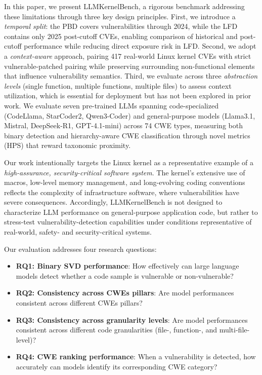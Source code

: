 \documentclass[lettersize,journal]{IEEEtran}
\begin{document}
In this paper, we present LLMKernelBench, a rigorous benchmark addressing these limitations through three key design principles. First, we introduce a \emph{temporal split}: the \gls{PBD} covers vulnerabilities through 2024, while the \gls{LFD} contains only 2025 post-cutoff CVEs, enabling comparison of historical and post-cutoff performance while reducing direct exposure risk in LFD. Second, we adopt a \emph{context-aware} approach, pairing 417 real-world Linux kernel CVEs with strict vulnerable-patched pairing while preserving surrounding non-functional elements that influence vulnerability semantics. Third, we evaluate across three \emph{abstraction levels} (single function, multiple functions, multiple files) to assess context utilization, which is essential for deployment but has not been explored in prior work. We evaluate seven pre-trained \glspl{LLM} spanning code-specialized (CodeLlama, StarCoder2, Qwen3-Coder) and general-purpose models (Llama3.1, Mistral, DeepSeek-R1, GPT-4.1-mini) across 74 \gls{CWE} types, measuring both binary detection and hierarchy-aware CWE classification through novel metrics (\gls{HPS}) that reward taxonomic proximity.

Our work intentionally targets the Linux kernel as a representative example of a \emph{high-assurance, security-critical software system}. The kernel’s extensive use of macros, low-level memory management, and long-evolving coding conventions reflects the complexity of infrastructure software, where vulnerabilities have severe consequences. Accordingly, LLMKernelBench is not designed to characterize LLM performance on general-purpose application code, but rather to stress-test vulnerability-detection capabilities under conditions representative of real-world, safety- and security-critical systems.

Our evaluation addresses four research questions: 



\begin{itemize}

\item \textbf{RQ1: Binary \gls{SVD} performance}: How effectively can large language models detect whether a code sample is vulnerable or non-vulnerable?

\item \textbf{RQ2: Consistency across \glspl{CWE} pillars}: Are model performances consistent across different \glspl{CWE} pillars?

\item \textbf{RQ3: Consistency across granularity levels}: Are model performances consistent across different code granularities (file-, function-, and multi-file-level)?

\item \textbf{RQ4: CWE ranking performance}: When a vulnerability is detected, how accurately can models identify its corresponding \gls{CWE} category?
\end{itemize}
\end{document}
